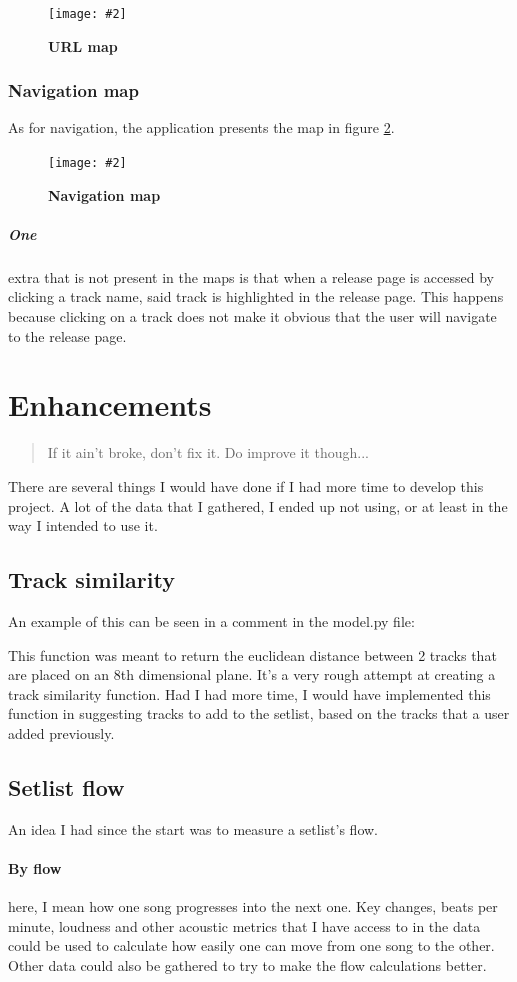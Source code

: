 \documentclass[10pt, a4paper]{article}
\newcommand{\figuremacro}[5]{
\begin{figure}[#1]
\centering
\texttt{[image: \#2]}
\caption[#3]{\textbf{#3}#4}
\label{fig:#2}
\end{figure}
}
\begin{document}
        \figuremacro{h}{url-map}{URL map}{}{1.0}


        \subsubsection{Navigation map}
        As for navigation, the application presents the map in figure \ref{fig:nav-map}.

        \figuremacro{h}{nav-map}{Navigation map}{}{1.0}


        \subparagraph{One} extra that is not present in the maps is that when a release page is accessed by clicking a track name, said track is highlighted in the release page. This happens because clicking on a track does not make it obvious that the user will navigate to the release page.

        \section{Enhancements}
        \label{sec:enhancements}
        \blockquote{If it ain't broke, don't fix it. Do improve it though...}

        There are several things I would have done if I had more time to develop this project. A lot of the data that I gathered, I ended up not using, or at least in the way I intended to use it. 

        \subsection{Track similarity}	
        An example of this can be seen in a comment in the model.py file:
       
        This function was meant to return the euclidean distance between 2 tracks that are placed on an 8th dimensional plane. It's a very rough attempt at creating a track similarity function. Had I had more time, I would have implemented this function in suggesting tracks to add to the setlist, based on the tracks that a user added previously.

        \subsection{Setlist flow}
        An idea I had since the start was to measure a setlist's flow.\\
        \paragraph{By flow} here, I mean how one song progresses into the next one. Key changes, beats per minute, loudness and other acoustic metrics that I have access to in the data could be used to calculate how easily one can move from one song to the other. Other data could also be gathered to try to make the flow calculations better.
\end{document}
